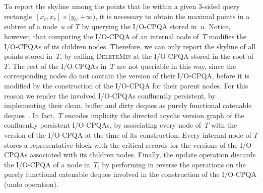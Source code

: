 \documentclass[]{article}
\begin{document}
To report the skyline among the points that lie within a given 3-sided query
rectangle~$[x_\ell, x_r] \times [y_b, +\infty)$, it is necessary to obtain
the maximal points in a subtree of a node~$u$ of $T$ by querying the I/O-CPQA
stored in~$u$. Notice, however, that computing the I/O-CPQA of an internal
node of~$T$ modifies the I/O-CPQAs of its children nodes. Therefore, we can
only report the skyline of all points stored in~$T$, by calling
\textsc{DeleteMin} at the I/O-CPQA stored in the root of~$T$. The rest of the
I/O-CPQAs in~$T$ are not queriable in this way, since the corresponding nodes
do not contain the version of their I/O-CPQA, before it is modified by the
construction of the I/O-CPQA for their parent nodes. For this reason we render
the involved I/O-CPQAs confluently persistent, by implementing their clean,
buffer and dirty deques as purely functional catenable deques~\cite{KT99}. In
fact,~$T$ encodes implicity the directed acyclic version graph of the
confluently persistent I/O-CPQAs, by associating every node of~$T$ with the
version of the I/O-CPQA at the time of its construction. Every internal node
of $T$ stores a representative block with the critical records for the
versions of the I/O-CPQAs associated with its children nodes. Finally, the
update operation discards the I/O-CPQA of a node in~$T$, by performing in
reverse the operations on the purely functional catenable deques involved in
the construction of the I/O-CPQA (undo operation).
\end{document}
